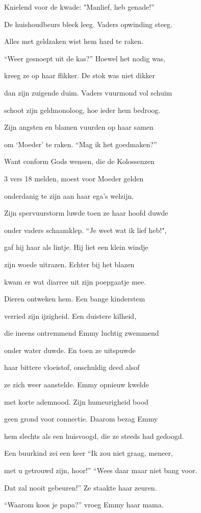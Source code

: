Knielend voor de kwade:
"Manlief, heb genade!”

De huishoudbeurs bleek leeg.
Vaders opwinding steeg.

Alles met geldzaken
wist hem hard te raken.

“Weer gesnoept uit de kas?”
Hoewel het nodig was,

kreeg ze op haar flikker.
De stok was niet dikker

dan zijn zuigende duim.
Vaders vuurmond vol schuim

schoot zijn geldmonoloog,
hoe ieder hem bedroog.

Zijn angsten en blamen
vuurden op haar samen

om ‘Moeder’ te raken.
“Mag ik het goedmaken?”

Want conform Gods wensen,
die de Kolossenzen

3 vers 18 melden,
moest voor Moeder gelden

onderdanig te zijn
aan haar ega’s welzijn.

Zijn spervuurstorm luwde
toen ze haar hoofd duwde

onder vaders schaamklep.
“Je weet wat ik lief heb!",

gaf hij haar als lintje.
Hij liet een klein windje

zijn woede uitrazen.
Echter bij het blazen

kwam er wat diarree
uit zijn poepgaatje mee.

Dieren ontweken hem.
Een bange kinderstem

verried zijn ijzigheid.
Een duistere kilheid,

die ineens ontremmend
Emmy luchtig zwemmend

onder water duwde.
En toen ze uitspuwde

haar bittere vloeistof,
onschuldig deed alsof

ze zich weer aanstelde.
Emmy opnieuw kwelde

met korte ademnood.
Zijn humeurigheid bood

geen grond voor connectie.
Daarom bezag Emmy

hem slechts als een huisvoogd,
die ze steeds had gedoogd.

Een buurkind zei een keer
“Ik zou niet graag, meneer,

met u getrouwd zijn, hoor!”
“Wees daar maar niet bang voor.

Dat zal nooit gebeuren!”
Ze staakte haar zeuren.

“Waarom koos je papa?”
vroeg Emmy haar mama.

